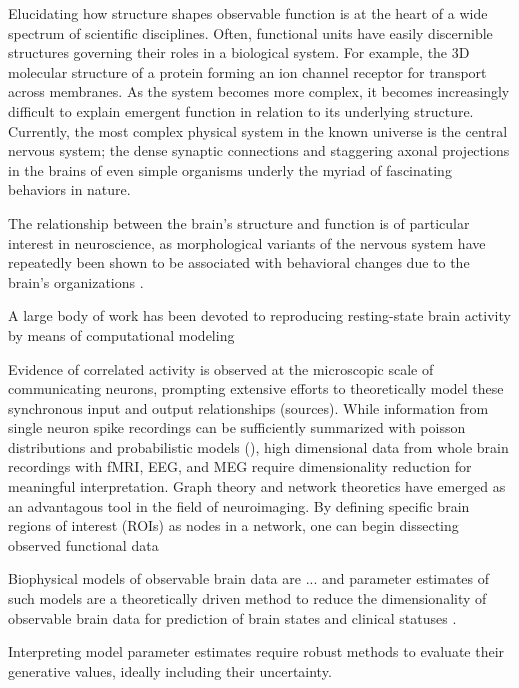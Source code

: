 Elucidating how structure shapes observable function is at the heart of a wide spectrum of scientific disciplines. Often, functional units have easily discernible structures governing their roles in a biological system. For example, the 3D molecular structure of a protein forming an ion channel receptor for transport across membranes. As the system becomes more complex, it becomes increasingly difficult to explain emergent function in relation to its underlying structure. Currently, the most complex physical system in the known universe is the central nervous system; the dense synaptic connections and staggering axonal projections in the brains of even simple organisms underly the myriad of fascinating behaviors in nature.

The relationship between the brain's structure and function is of particular interest in neuroscience, as morphological variants of the nervous system have repeatedly been shown to be associated with behavioral changes due to the brain's organizations \cite{sharp_default_2011, shen_using_2017}. 

A large body of work has been devoted to reproducing resting-state brain activity by means of computational modeling

Evidence of correlated activity is observed at the microscopic scale of communicating neurons, prompting extensive efforts to theoretically model these synchronous input  and output relationships (sources). While information from single neuron spike recordings can be sufficiently summarized with poisson distributions and probabilistic models (), high dimensional data from whole brain recordings with fMRI, EEG, and MEG require dimensionality reduction for meaningful interpretation. Graph theory and network theoretics have emerged as an advantagous tool in the field of neuroimaging. By defining specific brain regions of interest (ROIs) as nodes in a network, one can begin dissecting observed functional data 


Biophysical models of observable brain data are ... and parameter estimates of such models are a theoretically driven method to reduce the dimensionality of observable brain data for prediction of brain states and clinical statuses \cite{huys_computational_2016}.

Interpreting model parameter estimates require robust methods to evaluate their generative values, ideally including their uncertainty. 

